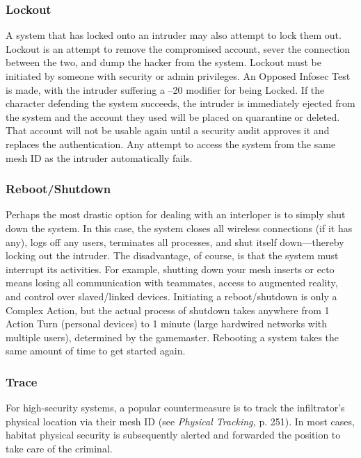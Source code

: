 \subsubsection{Lockout}

A system that has locked onto an intruder may also 
attempt to lock them out. Lockout is an attempt to 
remove the compromised account, sever the connection
between the two, and dump the hacker from
the system.
Lockout must be initiated by someone with security
or admin privileges. An Opposed Infosec Test is
made, with the intruder suffering a –20 modifier for 
being Locked. If the character defending the system 
succeeds, the intruder is immediately ejected from 
the system and the account they used will be placed 
on quarantine or deleted. That account will not be 
usable again until a security audit approves it and 
replaces the authentication. Any attempt to access 
the system from the same mesh ID as the intruder 
automatically fails.

\subsubsection{Reboot/Shutdown}

Perhaps the most drastic option for dealing with an 
interloper is to simply shut down the system. In this 
case, the system closes all wireless connections (if it 
has any), logs off any users, terminates all processes, 
and shut itself down—thereby locking out the intruder. 
The disadvantage, of course, is that the system must 
interrupt its activities. For example, shutting down 
your mesh inserts or ecto means losing all communication
with teammates, access to augmented reality, and
control over slaved/linked devices.
Initiating a reboot/shutdown is only a Complex 
Action, but the actual process of shutdown takes 
anywhere from 1 Action Turn (personal devices) to 1 
minute (large hardwired networks with multiple users), 
determined by the gamemaster. Rebooting a system 
takes the same amount of time to get started again.

\subsubsection{Trace}

For high-security systems, a popular countermeasure 
is to track the infiltrator's physical location via their 
mesh ID (see \textit{Physical Tracking,} p. 251). In most cases, 
habitat physical security is subsequently alerted and 
forwarded the position to take care of the criminal.

